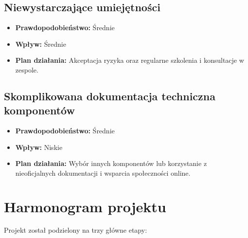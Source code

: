 \subsection{Niewystarczające umiejętności}
\begin{itemize}
    \item \textbf{Prawdopodobieństwo:} Średnie
    \item \textbf{Wpływ:} Średnie
    \item \textbf{Plan działania:} Akceptacja ryzyka oraz regularne szkolenia i konsultacje w zespole.
\end{itemize}

\subsection{Skomplikowana dokumentacja techniczna komponentów}
\begin{itemize}
    \item \textbf{Prawdopodobieństwo:} Średnie
    \item \textbf{Wpływ:} Niskie
    \item \textbf{Plan działania:} Wybór innych komponentów lub korzystanie z nieoficjalnych dokumentacji i wsparcia społeczności online.
\end{itemize}

\section{Harmonogram projektu}
Projekt został podzielony na trzy główne etapy:

